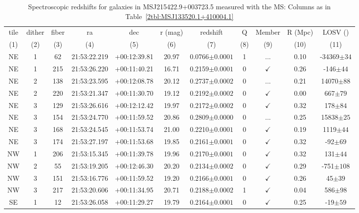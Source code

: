 \begin{landscape}
	\begin{table}
		\centering 
		\caption[Spectroscopic redshifts for galaxies in MSJ215422.9+003723.5]{Spectroscopic redshifts for galaxies in MSJ215422.9+003723.5 measured with the MS: Columns as in Table~\ref{2tbl:MSJ133520.1+410004.1}}
		\begin{tabular}{ccccccccccc}
			\hline
			tile & dither & fiber & ra & dec & r (mag) & redshift & Q & Member & R (Mpc) & LOSV (\kms) \\
			(1) & (2) & (3) & (4) & (5) & (6) & (7) & (8) & (9) & (10) & (11) \\
			\hline \hline
	NE & 1 & 62 & 21:53:22.219 & +00:12:39.81 & 20.97 & 0.0766$\pm{0.0001}$ & 1 & ... & 0.10 & -34369$\pm{34}$ \\
	NE & 1 & 215 & 21:53:26.220 & +00:11:40.21 & 16.71 & 0.2159$\pm{0.0001}$ & 0 & $\checkmark$ & 0.26 & -146$\pm{44}$ \\
	NE & 2 & 138 & 21:53:23.595 & +00:12:08.78 & 20.12 & 0.2737$\pm{0.0002}$ & 0 & ... & 0.21 & 14070$\pm{88}$ \\
	NE & 2 & 220 & 21:53:21.347 & +00:11:30.70 & 19.12 & 0.2192$\pm{0.0002}$ & 0 & $\checkmark$ & 0.00 & 667$\pm{79}$ \\
	NE & 3 & 129 & 21:53:26.616 & +00:12:12.42 & 19.97 & 0.2172$\pm{0.0002}$ & 0 & $\checkmark$ & 0.32 & 178$\pm{84}$ \\
	NE & 3 & 154 & 21:53:24.770 & +00:11:59.52 & 20.86 & 0.2809$\pm{0.0000}$ & 0 & ... & 0.25 & 15838$\pm{25}$ \\
	NE & 3 & 168 & 21:53:24.545 & +00:11:53.74 & 21.00 & 0.2210$\pm{0.0001}$ & 0 & $\checkmark$ & 0.19 & 1119$\pm{44}$ \\
	NE & 3 & 174 & 21:53:27.197 & +00:11:53.68 & 19.85 & 0.2161$\pm{0.0001}$ & 0 & $\checkmark$ & 0.32 & -92$\pm{69}$ \\
	NW & 1 & 206 & 21:53:15.345 & +00:11:39.78 & 19.96 & 0.2170$\pm{0.0001}$ & 0 & $\checkmark$ & 0.32 & 131$\pm{44}$ \\
	NW & 2 & 55 & 21:53:19.205 & +00:12:46.30 & 20.20 & 0.2134$\pm{0.0002}$ & 0 & $\checkmark$ & 0.29 & -751$\pm{108}$ \\
	NW & 3 & 151 & 21:53:16.776 & +00:11:59.52 & 19.20 & 0.2166$\pm{0.0001}$ & 0 & $\checkmark$ & 0.26 & 45$\pm{39}$ \\
	NW & 3 & 217 & 21:53:20.606 & +00:11:34.95 & 20.71 & 0.2188$\pm{0.0002}$ & 1 & $\checkmark$ & 0.04 & 586$\pm{98}$ \\
	SE & 1 & 12 & 21:53:26.058 & +00:11:29.27 & 19.79 & 0.2164$\pm{0.0001}$ & 0 & $\checkmark$ & 0.25 & -19$\pm{59}$ \\

\end{tabular}
\end{table}
\end{landscape}
